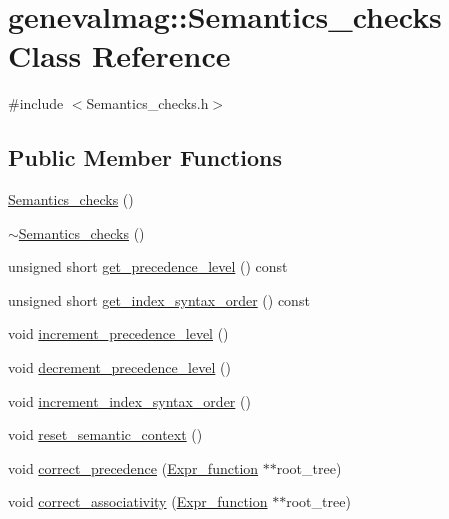 \hypertarget{classgenevalmag_1_1Semantics__checks}{
\section{genevalmag::Semantics\_\-checks Class Reference}
\label{classgenevalmag_1_1Semantics__checks}
}


{\ttfamily \#include $<$Semantics\_\-checks.h$>$}

\subsection*{Public Member Functions}
\begin{DoxyCompactItemize}
\item 
\hyperlink{classgenevalmag_1_1Semantics__checks_a332b806015b2d142ebaaa5ec5f7f6078}{Semantics\_\-checks} ()
\item 
\hyperlink{classgenevalmag_1_1Semantics__checks_a77ad2416d9844554db3602939a9f462c}{$\sim$Semantics\_\-checks} ()
\item 
unsigned short \hyperlink{classgenevalmag_1_1Semantics__checks_ad6b0e8d52900149631ae1d38ce61bf94}{get\_\-precedence\_\-level} () const 
\item 
unsigned short \hyperlink{classgenevalmag_1_1Semantics__checks_a6d51fcd1f3ed2d6bf5470de0fb5b7770}{get\_\-index\_\-syntax\_\-order} () const 
\item 
void \hyperlink{classgenevalmag_1_1Semantics__checks_ae9e488640f503bbd04a212f282f48826}{increment\_\-precedence\_\-level} ()
\item 
void \hyperlink{classgenevalmag_1_1Semantics__checks_a0596851fd5b0e972d7b21a116141e154}{decrement\_\-precedence\_\-level} ()
\item 
void \hyperlink{classgenevalmag_1_1Semantics__checks_ac755d47def82c431fa38053a58f231b6}{increment\_\-index\_\-syntax\_\-order} ()
\item 
void \hyperlink{classgenevalmag_1_1Semantics__checks_a26db5c186627aa6fcfc8e69b26b7706c}{reset\_\-semantic\_\-context} ()
\item 
void \hyperlink{classgenevalmag_1_1Semantics__checks_a5ad77ec398637204eea7e88b5d4fa74e}{correct\_\-precedence} (\hyperlink{classgenevalmag_1_1Expr__function}{Expr\_\-function} $\ast$$\ast$root\_\-tree)
\item 
void \hyperlink{classgenevalmag_1_1Semantics__checks_a7cc9baa891ee17c0e4140014597c49d8}{correct\_\-associativity} (\hyperlink{classgenevalmag_1_1Expr__function}{Expr\_\-function} $\ast$$\ast$root\_\-tree)

\end{DoxyCompactItemize}

